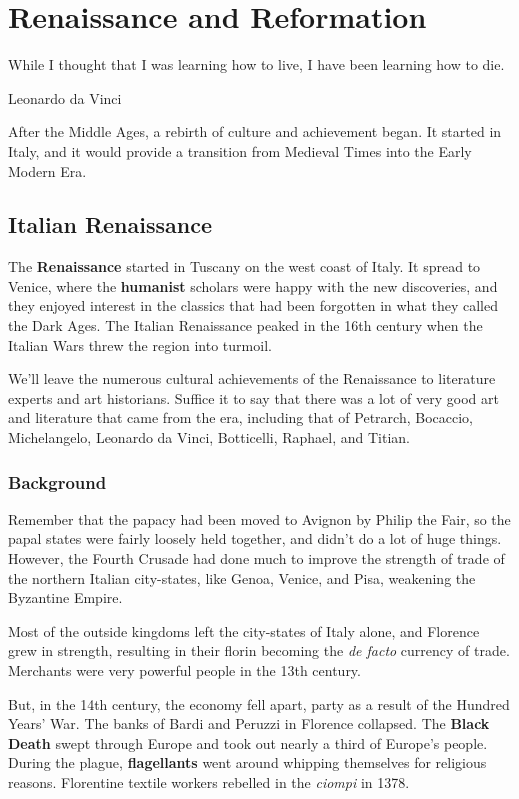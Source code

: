 \chapter{Renaissance and Reformation}

\epigraph{%
  While I thought that I was learning how to live, I have been learning how to die.
}{Leonardo da Vinci}

After the Middle Ages, a rebirth of culture and achievement began.
It started in Italy, and it would provide a transition from Medieval Times into the Early Modern Era.

\section{Italian Renaissance}

The \textbf{Renaissance} started in Tuscany on the west coast of Italy.
It spread to Venice, where the \textbf{humanist} scholars were happy with the new discoveries,
and they enjoyed interest in the classics that had been forgotten in what they called the Dark Ages.
The Italian Renaissance peaked in the 16th century when the Italian Wars threw the region into turmoil.

We'll leave the numerous cultural achievements of the Renaissance to literature experts and art historians.
Suffice it to say that there was a lot of very good art and literature that came from the era,
including that of Petrarch, Bocaccio, Michelangelo, Leonardo da Vinci, Botticelli, Raphael, and Titian.

\subsection*{Background}

Remember that the papacy had been moved to Avignon by Philip the Fair,
so the papal states were fairly loosely held together, and didn't do a lot of huge things.
However, the Fourth Crusade had done much to improve the strength of trade of the northern Italian city-states,
like Genoa, Venice, and Pisa, weakening the Byzantine Empire.

Most of the outside kingdoms left the city-states of Italy alone,
and Florence grew in strength, resulting in their florin becoming the \textit{de facto} currency of trade.
Merchants were very powerful people in the 13th century.

But, in the 14th century, the economy fell apart, party as a result of the Hundred Years' War.
The banks of Bardi and Peruzzi in Florence collapsed.
The \textbf{Black Death} swept through Europe and took out nearly a third of Europe's people.
During the plague, \textbf{flagellants} went around whipping themselves for religious reasons.
Florentine textile workers rebelled in the \textit{ciompi} in 1378.

